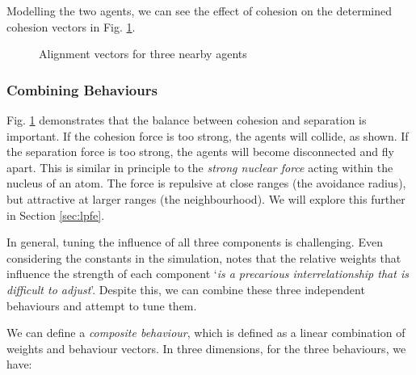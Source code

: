 \documentclass[12pt]{article}
\begin{document}
Modelling the two agents, we can see the effect of cohesion on the determined cohesion vectors in Fig. \ref{fig:cohesion-2d}. 

\begin{figure}[ht]
    \centering
    \caption{Alignment vectors for three nearby agents}
    \label{fig:cohesion-2d}
\end{figure}

\subsubsection{Combining Behaviours}
\label{sec:combining-behaviours}

Fig. \ref{fig:cohesion-2d} demonstrates that the balance between cohesion and separation is important. If the cohesion force is too strong, the agents will collide, as shown. If the separation force is too strong, the agents will become disconnected and fly apart. This is similar in principle to the \emph{strong nuclear force} acting within the nucleus of an atom. The force is repulsive at close ranges (the avoidance radius), but attractive at larger ranges (the neighbourhood). We will explore this further in Section \ref{sec:lpfe}.

In general, tuning the influence of all three components is challenging. Even considering the constants in the simulation, \citet{Reynolds} notes that the relative weights that influence the strength of each component `\emph{is a precarious interrelationship that is difficult to adjust}'. Despite this, we can combine these three independent behaviours and attempt to tune them. 

We can define a \emph{composite behaviour}, which is defined as a linear combination of weights and behaviour vectors. In three dimensions, for the three behaviours, we have:
\end{document}
